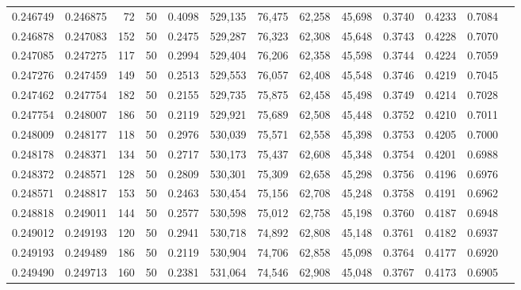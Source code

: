 \begin{tabular}{rrrrrrrrrrrrr}
0.246749 & 0.246875 &    72 &  50 &                                     0.4098 & 529,135 &  76,475 &  62,258 &  45,698 & 0.3740 & 0.4233 & 0.7084 \\
0.246878 & 0.247083 &   152 &  50 &                                     0.2475 & 529,287 &  76,323 &  62,308 &  45,648 & 0.3743 & 0.4228 & 0.7070 \\
0.247085 & 0.247275 &   117 &  50 &                                     0.2994 & 529,404 &  76,206 &  62,358 &  45,598 & 0.3744 & 0.4224 & 0.7059 \\
0.247276 & 0.247459 &   149 &  50 &                                     0.2513 & 529,553 &  76,057 &  62,408 &  45,548 & 0.3746 & 0.4219 & 0.7045 \\
0.247462 & 0.247754 &   182 &  50 &                                     0.2155 & 529,735 &  75,875 &  62,458 &  45,498 & 0.3749 & 0.4214 & 0.7028 \\
0.247754 & 0.248007 &   186 &  50 &                                     0.2119 & 529,921 &  75,689 &  62,508 &  45,448 & 0.3752 & 0.4210 & 0.7011 \\
0.248009 & 0.248177 &   118 &  50 &                                     0.2976 & 530,039 &  75,571 &  62,558 &  45,398 & 0.3753 & 0.4205 & 0.7000 \\
0.248178 & 0.248371 &   134 &  50 &                                     0.2717 & 530,173 &  75,437 &  62,608 &  45,348 & 0.3754 & 0.4201 & 0.6988 \\
0.248372 & 0.248571 &   128 &  50 &                                     0.2809 & 530,301 &  75,309 &  62,658 &  45,298 & 0.3756 & 0.4196 & 0.6976 \\
0.248571 & 0.248817 &   153 &  50 &                                     0.2463 & 530,454 &  75,156 &  62,708 &  45,248 & 0.3758 & 0.4191 & 0.6962 \\
0.248818 & 0.249011 &   144 &  50 &                                     0.2577 & 530,598 &  75,012 &  62,758 &  45,198 & 0.3760 & 0.4187 & 0.6948 \\
0.249012 & 0.249193 &   120 &  50 &                                     0.2941 & 530,718 &  74,892 &  62,808 &  45,148 & 0.3761 & 0.4182 & 0.6937 \\
0.249193 & 0.249489 &   186 &  50 &                                     0.2119 & 530,904 &  74,706 &  62,858 &  45,098 & 0.3764 & 0.4177 & 0.6920 \\
0.249490 & 0.249713 &   160 &  50 &                                     0.2381 & 531,064 &  74,546 &  62,908 &  45,048 & 0.3767 & 0.4173 & 0.6905 \\

\end{tabular}
